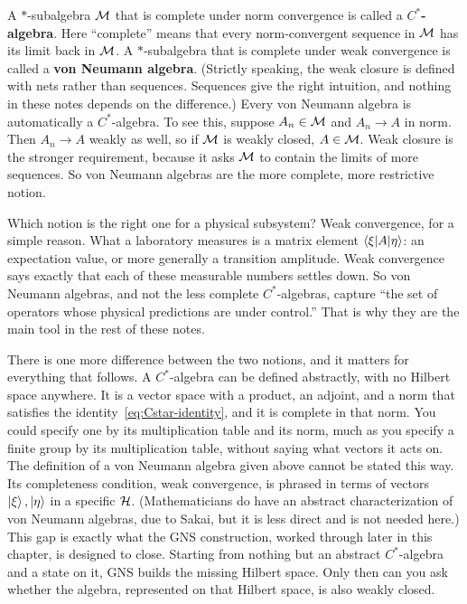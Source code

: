 A $*$-subalgebra $\mathcal{M}$ that is complete under norm convergence is called a \textbf{$C^*$-algebra}. Here
``complete'' means that every norm-convergent sequence in $\mathcal{M}$ has its limit back in $\mathcal{M}$. A $*$-subalgebra
that is complete under weak convergence is called a \textbf{von Neumann algebra}. (Strictly speaking, the
weak closure is defined with nets rather than sequences. Sequences give the right intuition, and nothing in
these notes depends on the difference.) Every von Neumann algebra is automatically a $C^*$-algebra. To see
this, suppose $A_n\in\mathcal{M}$ and $A_n\to A$ in norm. Then $A_n\to A$ weakly as well, so if $\mathcal{M}$ is weakly closed,
$A\in\mathcal{M}$. Weak closure is the stronger requirement, because it asks $\mathcal{M}$ to contain the limits of more
sequences. So von Neumann algebras are the more complete, more restrictive notion.

Which notion is the right one for a physical subsystem? Weak convergence, for a simple reason. What a
laboratory measures is a matrix element $\braket{\xi|A|\eta}$: an expectation value, or more generally a
transition amplitude. Weak convergence says exactly that each of these measurable numbers settles down. So
von Neumann algebras, and not the less complete $C^*$-algebras, capture ``the set of operators whose physical
predictions are under control.'' That is why they are the main tool in the rest of these notes.

There is one more difference between the two notions, and it matters for everything that follows. A
$C^*$-algebra can be defined abstractly, with no Hilbert space anywhere. It is a vector space with a product,
an adjoint, and a norm that satisfies the identity~\eqref{eq:Cstar-identity}, and it is complete in that
norm. You could specify one by its multiplication table and its norm, much as you specify a finite group by
its multiplication table, without saying what vectors it acts on. The definition of a von Neumann algebra
given above cannot be stated this way. Its completeness condition, weak convergence, is phrased in terms of
vectors $\ket\xi,\ket\eta$ in a specific $\mathcal{H}$. (Mathematicians do have an abstract characterization of von
Neumann algebras, due to Sakai, but it is less direct and is not needed here.) This gap is exactly what the
GNS construction, worked through later in this chapter, is designed to close. Starting from nothing but an
abstract $C^*$-algebra and a state on it, GNS builds the missing Hilbert space. Only then can you ask whether
the algebra, represented on that Hilbert space, is also weakly closed.

